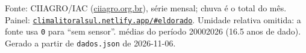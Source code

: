 \documentclass[10pt,a4paper]{article}
\begin{document}
\vspace{1pt}
{\tiny\color{cinza}
Fonte: CIIAGRO/IAC (\href{http://ciiagro.org.br}{ciiagro.org.br}), série mensal;
chuva é o total do mês. Painel:
\href{https://climalitoralsul.netlify.app/\#eldorado}%
{\texttt{climalitoralsul.netlify.app/\#eldorado}}.
Umidade relativa omitida: a fonte usa \texttt{0} para ``sem sensor''. 
médias do período 2000\textendash{}2026 (16.5 anos de dado).
Gerado a partir de \texttt{dados.json} de 2026-11-06.}
\end{document}
